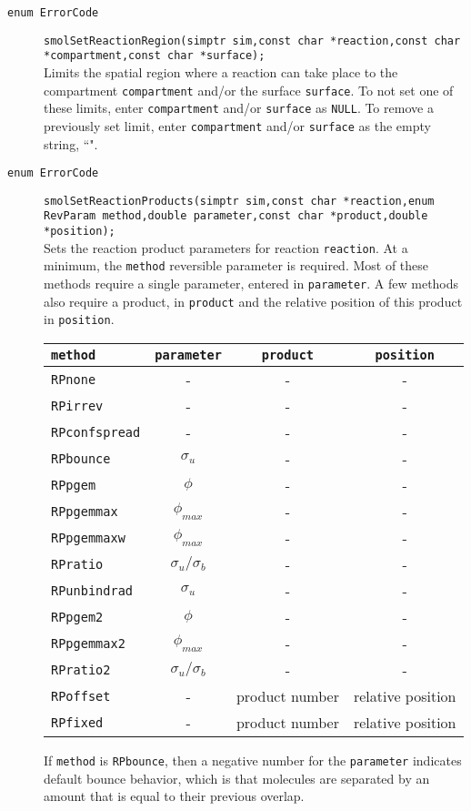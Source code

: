 \documentclass {book}
\begin{document}
\begin{description}
\item[\texttt{enum ErrorCode}]
\texttt{smolSetReactionRegion(simptr sim,const char *reaction,const char *compartment,const char *surface);}
\hfill \\
Limits the spatial region where a reaction can take place to the compartment \texttt{compartment} and/or the surface \texttt{surface}. To not set one of these limits, enter \texttt{compartment} and/or \texttt{surface} as \texttt{NULL}. To remove a previously set limit, enter \texttt{compartment} and/or \texttt{surface} as the empty string, ``".

\item[\texttt{enum ErrorCode}]
\texttt{smolSetReactionProducts(simptr sim,const char *reaction,enum RevParam method,double parameter,const char *product,double *position);}
\hfill \\
Sets the reaction product parameters for reaction \texttt{reaction}. At a minimum, the \texttt{method} reversible parameter is required. Most of these methods require a single parameter, entered in \texttt{parameter}. A few methods also require a product, in \texttt{product} and the relative position of this product in \texttt{position}.

\begin{longtable}[c]{lccc}
\texttt{method} & \texttt{parameter} & \texttt{product} & \texttt{position}\\
\hline
\texttt{RPnone} & - & - & -\\
\texttt{RPirrev} & - & - & -\\
\texttt{RPconfspread} & - & - & -\\
\texttt{RPbounce} & $\sigma_u$ & - & -\\
\texttt{RPpgem} & $\phi$ & - & -\\
\texttt{RPpgemmax} & $\phi_{max}$ & - & -\\
\texttt{RPpgemmaxw} & $\phi_{max}$ & - & -\\
\texttt{RPratio} & $\sigma_u/\sigma_b$ & - & -\\
\texttt{RPunbindrad} & $\sigma_u$ & - & -\\
\texttt{RPpgem2} & $\phi$ & - & -\\
\texttt{RPpgemmax2} & $\phi_{max}$ & - & -\\
\texttt{RPratio2} & $\sigma_u/\sigma_b$ & - & -\\
\texttt{RPoffset} & - & product number & relative position\\
\texttt{RPfixed} & - & product number & relative position\\
\end{longtable}

If \texttt{method} is \texttt{RPbounce}, then a negative number for the \texttt{parameter} indicates default bounce behavior, which is that molecules are separated by an amount that is equal to their previous overlap.

\end{description}
\end{document}

